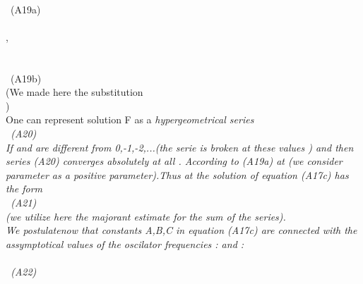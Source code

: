 \documentclass[a4paper,12pt] {article}
\begin{document}
\\ \coordHE{} \ (A19a)\\\coordHE{}
\\\coordHE{},
\\ \coordHE{} \\\coordHE{} \\\coordHE{} \ (A19b)
\\ (We made here the substitution \\\coordHE{} )
\\ One can represent  solution F as a \it hypergeometrical series\rm
 \\\coordHE{}
\ (A20)
\\ If \myHighlight{$\alpha$}\coordHE{} and \myHighlight{$\beta $}\coordHE{} are different from 0,-1,-2,...(the serie is broken at these values ) and
\coordHE{} then \it  series \rm  (A20)  \it converges absolutely at all \rm
 \coordHE{}. According to (A19a) \coordHE{}  at \coordHE{}  (we consider parameter
 \myHighlight{$\varepsilon$}\coordHE{}  as a positive parameter).Thus at  \coordHE{}  the solution of equation  (A17c) has the
form \\ \coordHE{} \ (A21)\\ (we utilize here the \it majorant \rm estimate for the sum of
 the series).\\We
\it  postulate\rm  now that constants A,B,C in  equation  (A17c) are \it connected with the assymptotical
 values of the oscilator frequencies \rm : \myHighlight{$ \omega (\pm \infty) \equiv \omega _\pm  $}\coordHE{} and
 \coordHE{} :\\\coordHE{}\\\coordHE{} \ (A22)
\end{document}
